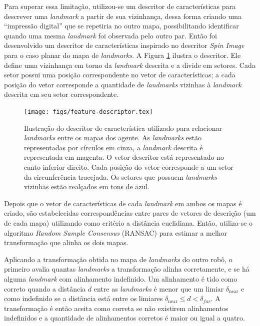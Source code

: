 Para superar essa limitação, utilizou-se um descritor de características 
para descrever uma \textit{landmark} a partir de sua vizinhança, dessa 
forma criando uma ``impressão digital'' que se repetiria no outro mapa, 
possibilitando identificar quando uma mesma \textit{landmark} foi observada 
pelo outro par. Então foi desenvolvido um descritor de características 
inspirado no descritor \textit{Spin Image} \cite{johnson1999using} 
para o caso planar do mapa de \textit{landmarks}. A Figura \ref{fig:feature-descriptor} ilustra o descritor. Ele define uma 
vizinhança em torno da \textit{landmark} descrita e a divide em setores. 
Cada setor possui uma posição correspondente no vetor de características; 
a cada posição do vetor corresponde a quantidade de \textit{landmarks} 
vizinhas à \textit{landmark} descrita em seu setor correspondente.

\begin{figure}[h]
  \centering
  \texttt{[image: figs/feature-descriptor.tex]}
  \caption{Ilustração do descritor de característica utilizado para 
  relacionar \textit{landmarks} entre os mapas dos agente. As \textit{landmarks} estão representadas por círculos em cinza, a \textit{landmark} descrita é representada em magenta. O vetor descritor está representado no canto inferior direito. Cada posição do vetor corresponde a um setor da circunferência tracejada. Os setores que 
  possuem \textit{landmarks} vizinhas estão realçados em tons de azul.}
  \label{fig:feature-descriptor}
\end{figure}

Depois que o vetor de características de cada \textit{landmark} em ambos os 
mapas é criado, são estabelecidas correspondências entre pares de vetores de descrição (um de cada mapa) utilizando 
como critério a distância euclidiana. 
Então, utiliza-se o algoritmo \textit{Random Sample Consensus} (RANSAC) 
\cite{fischler1981random} para estimar a melhor transformação que alinha 
os dois mapas.

Aplicando a transformação obtida no mapa de \textit{landmarks} do outro 
robô, o primeiro avalia quantas \textit{landmarks} a transformação alinha 
corretamente, e se há alguma \textit{landmark} com alinhamento indefinido. 
Um alinhamento é tido como correto quando a distância $d$ entre as 
\textit{landmarks} é menor que um limiar $\delta_{\text{near}}$ e como 
indefinido se a distância está entre os limiares 
$\delta_{\text{near}} \leq d < \delta_{far}$. A transformação é então aceita 
como correta se não existirem alinhamentos indefinidos e a quantidade de 
alinhamentos corretos é maior ou igual a quatro.

